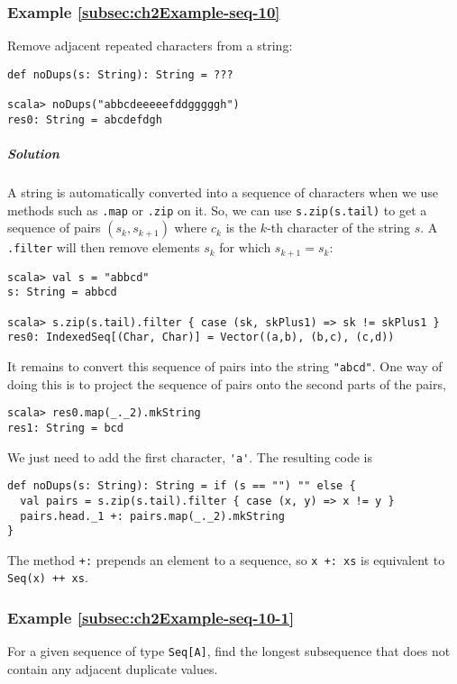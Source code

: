\subsubsection{Example \label{subsec:ch2Example-seq-10}\ref{subsec:ch2Example-seq-10}}

Remove adjacent repeated characters from a string:
\begin{lstlisting}
def noDups(s: String): String = ???

scala> noDups("abbcdeeeeefddgggggh")
res0: String = abcdefdgh
\end{lstlisting}


\subparagraph{Solution}

A string is automatically converted into a sequence of characters
when we use methods such as \lstinline!.map! or \lstinline!.zip!
on it. So, we can use \lstinline!s.zip(s.tail)! to get a sequence
of pairs $\left(s_{k},s_{k+1}\right)$ where $c_{k}$ is the $k$-th
character of the string $s$. A \lstinline!.filter! will then remove
elements $s_{k}$ for which $s_{k+1}=s_{k}$:
\begin{lstlisting}
scala> val s = "abbcd"
s: String = abbcd

scala> s.zip(s.tail).filter { case (sk, skPlus1) => sk != skPlus1 }
res0: IndexedSeq[(Char, Char)] = Vector((a,b), (b,c), (c,d))
\end{lstlisting}
It remains to convert this sequence of pairs into the string \lstinline!"abcd"!.
One way of doing this is to project the sequence of pairs onto the
second parts of the pairs,
\begin{lstlisting}
scala> res0.map(_._2).mkString
res1: String = bcd
\end{lstlisting}
We just need to add the first character, \lstinline!'a'!. The resulting
code is
\begin{lstlisting}
def noDups(s: String): String = if (s == "") "" else {
  val pairs = s.zip(s.tail).filter { case (x, y) => x != y }
  pairs.head._1 +: pairs.map(_._2).mkString
}
\end{lstlisting}
The method \lstinline!+:! prepends an element to a sequence, so \lstinline!x +: xs!
is equivalent to \lstinline!Seq(x) ++ xs!.

\subsubsection{Example \label{subsec:ch2Example-seq-10-1}\ref{subsec:ch2Example-seq-10-1}}

For a given sequence of type \lstinline!Seq[A]!, find the longest
subsequence that does not contain any adjacent duplicate values.

